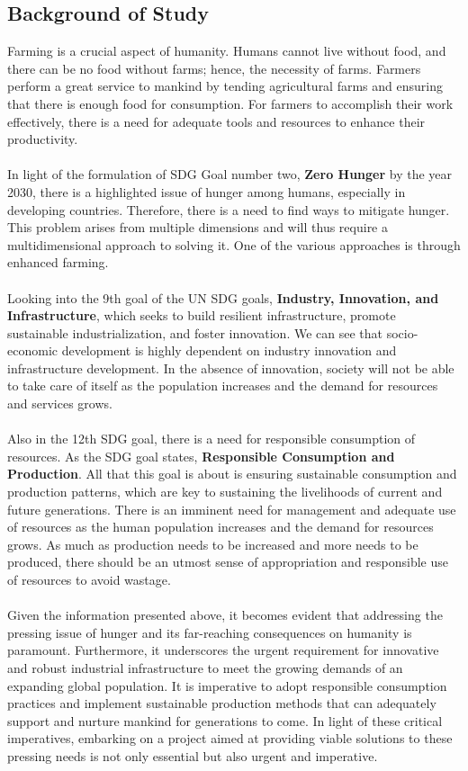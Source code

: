 \documentclass[12pt, a4paper]{article}
\begin{document}
\subsection{Background of Study}
Farming is a crucial aspect of humanity. Humans cannot live without food, and there can be no food without farms; hence, the necessity of farms. Farmers perform a great service to mankind by tending agricultural farms and ensuring that there is enough food for consumption. For farmers to accomplish their work effectively, there is a need for adequate tools and resources to enhance their productivity.\\
\\
In light of the formulation of SDG Goal number two, \textbf{Zero Hunger} by the year 2030\cite{unhunger}, there is a highlighted issue of hunger among humans, especially in developing countries. Therefore, there is a need to find ways to mitigate hunger. This problem arises from multiple dimensions and will thus require a multidimensional approach to solving it. One of the various approaches is through enhanced farming.\\
\\
Looking into the 9th goal of the UN SDG goals, \textbf{Industry, Innovation, and Infrastructure}, which seeks to build resilient infrastructure, promote sustainable industrialization, and foster innovation\cite{uninnovation}. We can see that socio-economic development is highly dependent on industry innovation and infrastructure development. In the absence of innovation, society will not be able to take care of itself as the population increases and the demand for resources and services grows.\\
\\
Also in the 12th SDG goal, there is a need for responsible consumption of resources. As the SDG goal states, \textbf{Responsible Consumption and Production}. All that this goal is about is ensuring sustainable consumption and production patterns, which are key to sustaining the livelihoods of current and future generations\cite{unresponsible}. There is an imminent need for management and adequate use of resources as the human population increases and the demand for resources grows. As much as production needs to be increased and more needs to be produced, there should be an utmost sense of appropriation and responsible use of resources to avoid wastage.\\
\\
Given the information presented above, it becomes evident that addressing the pressing issue of hunger and its far-reaching consequences on humanity is paramount. Furthermore, it underscores the urgent requirement for innovative and robust industrial infrastructure to meet the growing demands of an expanding global population. It is imperative to adopt responsible consumption practices and implement sustainable production methods that can adequately support and nurture mankind for generations to come. In light of these critical imperatives, embarking on a project aimed at providing viable solutions to these pressing needs is not only essential but also urgent and imperative.
\end{document}
